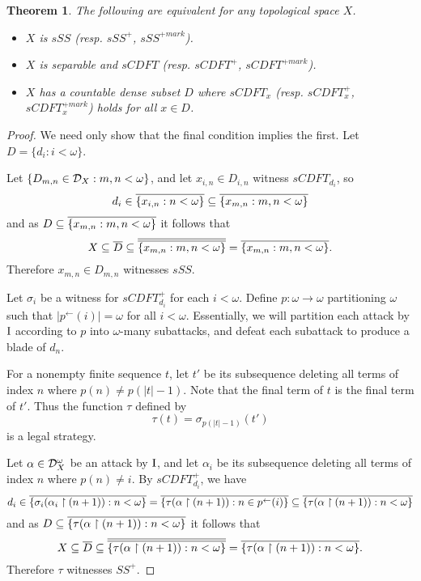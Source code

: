 \documentclass{amsart}
\theoremstyle{plain}
\newtheorem{theorem}{Theorem}
\theoremstyle{definition}
\theoremstyle{remark}
\theoremstyle{plain}
\theoremstyle{definition}
\theoremstyle{remark}
\begin{document}
\begin{theorem}
  The following are equivalent for any topological space \(X\).
  \begin{itemize}
    \item \(X\) is \(sSS\) (resp. \(sSS^+\), \(sSS^{+mark}\)).
    \item \(X\) is separable and \(sCDFT\)
          (resp. \(sCDFT^+\), \(sCDFT^{+mark}\)).
    \item \(X\) has a countable dense subset \(D\) where
          \(sCDFT_x\) (resp. \(sCDFT_x^+\), \(sCDFT_x^{+mark}\))
          holds for all \(x\in D\).
  \end{itemize}
\end{theorem}

\begin{proof}
  We need only show that the final condition implies the first.
  Let \(D=\{d_i:i<\omega\}\).

  Let \(\{D_{m,n}\in\mathcal{D}_X:m,n<\omega\}\), and let \(x_{i,n}\in D_{i,n}\)
  witness \(sCDFT_{d_i}\), so
  \[
    d_i
      \in
    \overline{\{x_{i,n}:n<\omega\}}
      \subseteq
    \overline{\{x_{m,n}:m,n<\omega\}}
  \]
  and as \(D\subseteq\overline{\{x_{m,n}:m,n<\omega\}}\)
  it follows that
  \[
    X
      \subseteq
    \overline{D}
      \subseteq
    \overline{\overline{\{x_{m,n}:m,n<\omega\}}}
      =
    \overline{\{x_{m,n}:m,n<\omega\}}
  .\]
  Therefore \(x_{m,n}\in D_{m,n}\) witnesses \(sSS\).

  Let \(\sigma_i\) be a witness for \(sCDFT_{d_i}^+\)
  for each \(i<\omega\). Define \(p:\omega\to\omega\) partitioning \(\omega\)
  such that \(|p^\leftarrow(i)|=\omega\) for all \(i<\omega\).
  Essentially, we will partition each
  attack by \(\mathrm{I}\) according to \(p\) into \(\omega\)-many subattacks, and
  defeat each subattack to produce a blade of \(d_n\).

  For a nonempty finite sequence \(t\), let \(t'\) be its subsequence deleting
  all terms of index \(n\) where \(p(n)\not=p(|t|-1)\).
  Note that the final term of \(t\) is the final term of \(t'\).
  Thus the function \(\tau\) defined by
  \[
    \tau(t)
      =
    \sigma_{p(|t|-1)}(t')
  \]
  is a legal strategy.

  Let \(\alpha\in\mathcal{D}_X^\omega\) be an attack by \(\mathrm{I}\),
  and let \(\alpha_i\) be its subsequence
  deleting all terms of index \(n\) where \(p(n)\not=i\).
  By \(sCDFT_{d_i}^+\), we have
  \[
    d_i
      \in
    \overline{\{\sigma_i(\alpha_i\restriction (n+1)):n<\omega\}}
      =
    \overline{\{\tau(\alpha\restriction(n+1)):n\in p^{\leftarrow}(i)\}}
      \subseteq
    \overline{\{\tau(\alpha\restriction(n+1)):n<\omega\}}
  \]
  and as \(D\subseteq\overline{\{\tau(\alpha\restriction(n+1)):n<\omega\}}\)
  it follows that
  \[
    X
      \subseteq
    \overline{D}
      \subseteq
    \overline{\overline{\{\tau(\alpha\restriction(n+1)):n<\omega\}}}
      =
    \overline{\{\tau(\alpha\restriction(n+1)):n<\omega\}}
  .\]
  Therefore \(\tau\) witnesses \(SS^+\).


\end{proof}
\end{document}
